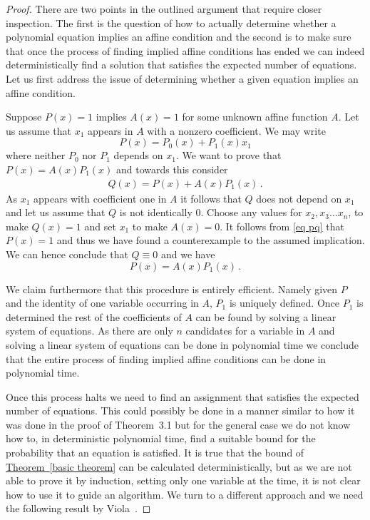 \documentclass[10pt]{article}
\theoremstyle{definition}
\numberwithin{equation}{section}
\newcommand{\expref}[2]{\texorpdfstring{\hyperref[#2]{#1~\ref{#2}}}{#1~\ref{#2}}}
\begin{document}
\begin{proof}
There are two points in the outlined argument
that require closer inspection.  The
first is the question of how to actually determine whether a 
polynomial equation implies an affine condition
and the second is to make sure that once
the process of finding implied affine conditions
has ended we can indeed deterministically find a
solution that satisfies the expected number of
equations.
Let us first address the issue of determining
whether a given equation implies an affine
condition.

Suppose $P(x)=1$ implies $A(x)=1$
for some unknown affine function $A$.
Let us assume that $x_1$ appears in $A$ with
a nonzero coefficient.  
We may write
$$
P(x)=P_0(x)+P_1(x)x_1$$
where neither $P_0$ nor $P_1$ depends on $x_1$.  We want
to prove that $P(x)=A(x)P_1(x)$ and towards this consider
\begin{eqnarray}\label{eq pq}
Q(x)=P(x)+A(x)P_1(x)\,.
\end{eqnarray}
As $x_1$ appears with coefficient one in $A$ it follows
that $Q$ does not depend on $x_1$ and let us assume that
$Q$ is not identically 0.  Choose any values
for $x_2, x_3 \ldots x_n$, to make $Q(x)=1$
and set $x_1$ to make $A(x)=0$.  It follows
from \eqref{eq pq} that $P(x)=1$ 
and thus we have found a counterexample 
to the assumed implication.  We can hence conclude
that $Q\equiv 0$ and we have 
$$
P(x)=A(x) P_1(x)\,.
$$

We claim furthermore that this procedure is entirely
efficient.  Namely given $P$ and the identity of
one variable occurring in $A$, $P_1$ is uniquely
defined.  Once $P_1$ is determined the rest
of the coefficients of $A$ can be found by
solving a linear system of equations.
As there are only $n$ candidates for a variable
in $A$ and solving a linear system of equations
can be done in polynomial time we conclude that the entire
process of finding implied affine conditions
can be done in polynomial time.

Once this process halts we need to find an assignment that satisfies the
expected number of equations.  This could
possibly be done in a manner similar
to how it was done in the proof of Theorem~3.1
but for the general case we do not know how to, in deterministic 
polynomial time,
find a suitable bound for the probability that an equation
is satisfied.  It is true that the bound of \expref{Theorem}{basic theorem}
can be calculated deterministically, but as we are not able to
prove it by induction, setting only one variable at the time,
it is not clear how to use it to guide an algorithm.
We turn to a different approach and we need the following
result by Viola~\cite{viola09}.


\end{proof}
\end{document}
